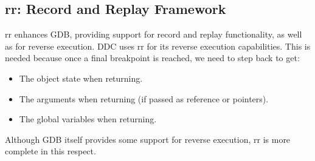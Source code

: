 \subsection{rr: Record and Replay Framework}

rr \cite{rr} enhances GDB, providing support for record and replay functionality, as well as for reverse execution.
%
DDC uses rr for its reverse execution capabilities. This is needed because once a final breakpoint is reached, we need to step back to get:
\begin{itemize}
    \item The object state when returning.
    \item The arguments when returning (if passed as reference or pointers).
    \item The global variables when returning.
\end{itemize}
Although GDB itself provides some support for reverse execution, rr is more complete in this respect.
